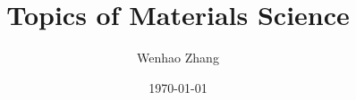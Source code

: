 \documentclass{article}
\begin{document}
\title{Topics of Materials Science}
\author{Wenhao Zhang}
\date{\today}
\maketitle

\tableofcontents




\end{document}
